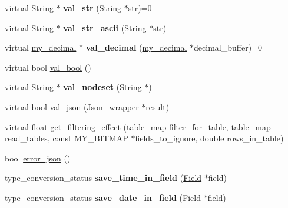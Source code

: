 \begin{DoxyCompactItemize}
\item 
\mbox{\label{classItem_a775078e0c5eeb20a3707dfbe50861600}} 
virtual String $\ast$ {\bfseries val\+\_\+str} (String $\ast$str)=0
\item 
\mbox{\label{classItem_a5fb88a1036fe3516824d804b50fa0e97}} 
virtual String $\ast$ {\bfseries val\+\_\+str\+\_\+ascii} (String $\ast$str)
\item 
\mbox{\label{classItem_a04197b89bab3afceac11df1efda905f4}} 
virtual \mbox{\hyperlink{classmy__decimal}{my\+\_\+decimal}} $\ast$ {\bfseries val\+\_\+decimal} (\mbox{\hyperlink{classmy__decimal}{my\+\_\+decimal}} $\ast$decimal\+\_\+buffer)=0
\item 
virtual bool \mbox{\hyperlink{classItem_a875594d2b9d99ccff3863bfd435828f0}{val\+\_\+bool}} ()
\item 
\mbox{\label{classItem_ac6658015996a5823f604fe73883d1591}} 
virtual String $\ast$ {\bfseries val\+\_\+nodeset} (String $\ast$)
\item 
virtual bool \mbox{\hyperlink{classItem_a57e763fcde2d0a819d21e31c59611290}{val\+\_\+json}} (\mbox{\hyperlink{classJson__wrapper}{Json\+\_\+wrapper}} $\ast$result)
\item 
virtual float \mbox{\hyperlink{classItem_a83f65da25aae04ad1aecebc1d43832c0}{get\+\_\+filtering\+\_\+effect}} (table\+\_\+map filter\+\_\+for\+\_\+table, table\+\_\+map read\+\_\+tables, const M\+Y\+\_\+\+B\+I\+T\+M\+AP $\ast$fields\+\_\+to\+\_\+ignore, double rows\+\_\+in\+\_\+table)
\item 
bool \mbox{\hyperlink{classItem_a3514d1992e60ef2d018eba61fc5ff269}{error\+\_\+json}} ()
\item 
\mbox{\label{classItem_ab81930a870271d35533fa56b4a7a3854}} 
type\+\_\+conversion\+\_\+status {\bfseries save\+\_\+time\+\_\+in\+\_\+field} (\mbox{\hyperlink{classField}{Field}} $\ast$field)
\item 
\mbox{\label{classItem_af6b431deeb4f7ea39b81006078142581}} 
type\+\_\+conversion\+\_\+status {\bfseries save\+\_\+date\+\_\+in\+\_\+field} (\mbox{\hyperlink{classField}{Field}} $\ast$field)
\item 
\mbox{\label{classItem_a8a2c68a13c05db268c4fe3a1db5563a0}} 

\end{DoxyCompactItemize}
